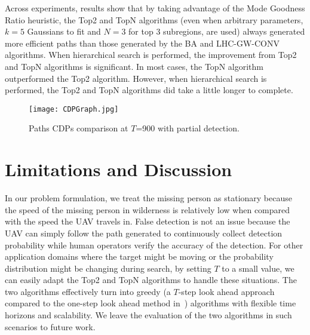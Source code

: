 \documentclass[journal]{IEEEtran}
\begin{document}
Across experiments, results show that by taking advantage of the Mode Goodness Ratio heuristic, the Top2 and TopN algorithms (even when arbitrary parameters, $k=5$ Gaussians to fit and $N=3$ for top 3 subregions, are used) always generated more efficient paths than those generated by the BA and LHC-GW-CONV algorithms. When hierarchical search is performed, the improvement from Top2 and TopN algorithms is significant. In most cases, the TopN algorithm outperformed the Top2 algorithm. However, when hierarchical search is performed, the Top2 and TopN algorithms did take a little longer to complete.
\begin{figure}
\centering
\texttt{[image: CDPGraph.jpg]}
\caption{Paths CDPs comparison at $T$=900 with partial detection.}
\label{CDPGraph}
\end{figure}




\section{Limitations and Discussion}
\label{sec:LimitationsAndDiscussion}

In our problem formulation, we treat the missing person as stationary because the speed of the missing person in wilderness is relatively low when compared with the speed the UAV travels in. False detection is not an issue because the UAV can simply follow the path generated to continuously collect detection probability while human operators verify the accuracy of the detection. For other application domains where the target might be moving or the probability distribution might be changing during search, by setting $T$ to a small value, we can easily adapt the Top2 and TopN algorithms to handle these situations. The two algorithms effectively turn into greedy (a $T$-step look ahead approach compared to the one-step look ahead method in~\cite{Bourgault2006}) algorithms with flexible time horizons and scalability. We leave the evaluation of the two algorithms in such scenarios to future work.
\end{document}

